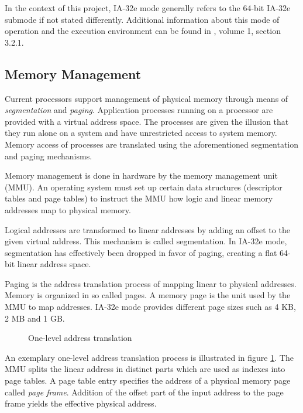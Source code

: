 In the context of this project, IA-32e mode generally refers to the 64-bit
IA-32e submode if not stated differently. Additional information about this mode
of operation and the execution environment can be found in \cite{IntelSDM},
volume 1, section 3.2.1.

\subsection{Memory Management}
Current processors support management of physical memory through means of
\emph{segmentation} and \emph{paging}.
Application processes running on a processor are provided with a virtual
address space. The processes are given the illusion that they run alone on a
system and have unrestricted access to system memory. Memory access of
processes are translated using the aforementioned segmentation and paging
mechanisms.

Memory management is done in hardware by the memory management unit
(MMU).  An operating system must set up certain data structures
(descriptor tables and page tables) to instruct the MMU how logic and linear
memory addresses map to physical memory.

Logical addresses are transformed to linear addresses by adding an offset to
the given virtual address. This mechanism is called segmentation. In IA-32e
mode, segmentation has effectively been dropped in favor of paging, creating a
flat 64-bit linear address space.

Paging is the address translation process of mapping linear to physical
addresses. Memory is organized in so called pages. A memory page is the unit
used by the MMU to map addresses. IA-32e mode provides different page sizes
such as 4 KB, 2 MB and 1 GB.

\begin{figure}[h]
	\centering
	
	\caption{One-level address translation}
	\label{fig:address-translation}
\end{figure}

An exemplary one-level address translation process is illustrated in figure
\ref{fig:address-translation}. The MMU splits the linear address in distinct
parts which are used as indexes into page tables. A page table entry specifies
the address of a physical memory page called \emph{page frame}.  Addition of the
offset part of the input address to the page frame yields the effective physical
address.

